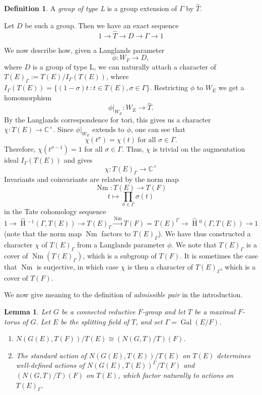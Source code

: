 \documentclass[11pt]{amsart}
\theoremstyle{plain}
\newtheorem{lemma}[theorem]{Lemma}
\newcommand{\HT}[1]{\hat{\HH}{}^{#1}}
\theoremstyle{definition}
\newtheorem{definition}[theorem]{Definition}
\DeclareMathOperator{\Gal}{Gal}
\DeclareMathOperator{\HH}{H}
\DeclareMathOperator{\Nm}{Nm}
\begin{document}
\begin{definition}
A \emph{group of type L} is a group extension of $\Gamma$ by $\hat{T}$.
\end{definition}

Let $D$ be such a group.  Then we have an exact sequence
$$1 \rightarrow \hat{T} \rightarrow D \rightarrow \Gamma \rightarrow 1$$

We now describe how, given a Langlands parameter
$$\phi : W_F \rightarrow D,$$
where $D$ is a group of type L, we can naturally attach a character of
$T(E)_{\Gamma} := T(E) / I_{\Gamma}(T(E))$, where
$I_{\Gamma}(T(E)) = \{(1 - \sigma)t \ : t \in T(E), \sigma \in \Gamma \}$.
Restricting $\phi$ to $W_E$ we get a homomorphism
$$\phi|_{W_E} : W_E \rightarrow \hat{T}.$$
By the Langlands correspondence for tori, this gives us a character
$\chi : T(E) \rightarrow \mathbb{C}^\times$.  Since $\phi|_{W_E}$ extends
to $\phi$, one can see that
$$\chi(t^{\sigma}) = \chi(t)\ \mbox{for all $\sigma \in \Gamma$.}$$
Therefore, $\chi(t^{\sigma - 1}) = 1$ for all $\sigma \in \Gamma$.
Thus, $\chi$ is trivial on the augmentation ideal $I_{\Gamma}(T(E))$
and gives $$\chi : T(E)_\Gamma \rightarrow \mathbb{C}^\times$$ Invariants
and coinvariants are related by the norm map
$$\Nm : T(E) \rightarrow T(F)$$ $$t \mapsto \displaystyle\prod_{\sigma \in \Gamma} \sigma(t)$$
in the Tate cohomology sequence
$$1 \rightarrow \HT{-1}(\Gamma,T(E)) \rightarrow T(E)_{\Gamma} \xrightarrow{\Nm} T(F)
  = T(E)^{\Gamma} \rightarrow \HT{0}(\Gamma,T(E)) \rightarrow 1$$
(note that the norm map $\Nm$ factors to $T(E)_{\Gamma}$).
We have thus constructed a character $\chi$ of $T(E)_{\Gamma}$ from a
Langlands parameter $\phi$. We note that $T(E)_{\Gamma}$ is a cover of
$\Nm(T(E)_{\Gamma})$, which is a subgroup of $T(F)$.  It is sometimes
the case that $\Nm$ is surjective, in which case $\chi$ is then a
character of $T(E)_{\Gamma}$, which is a cover of $T(F)$.

We now give meaning to the definition of \emph{admissible pair} in the introduction.

\begin{lemma}\label{weylgroups}
Let $G$ be a connected reductive $F$-group and let $T$ be a maximal
$F$-torus of $G$.  Let $E$ be the splitting field of $T$, and set
$\Gamma = \Gal(E/F)$.
\begin{enumerate}
\item $N(G(E), T(F)) / T(E) \cong (N(G,T)/T)(F)$.
\item The standard action of $N(G(E),T(E)) / T(E)$ on $T(E)$ determines
well-defined actions of $N(G(E), T(E))^{\Gamma} / T(F)$ and $(N(G,T)/T)(F)$
on $T(E)$, which factor naturally to actions on $T(E)_{\Gamma}$.
\end{enumerate}
\end{lemma}
\end{document}
